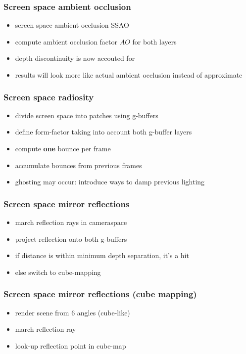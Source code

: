 \documentclass[aspectratio=169]{beamer}
\begin{document}
	\begin{frame}
		\frametitle{Screen space ambient occlusion}
		\begin{itemize}
			\item screen space ambient occlusion SSAO
			\item compute ambient occlusion factor $AO$ for both layers
			\item depth discontinuity is now accouted for
			\item results will look more like actual ambient occlusion instead of approximate
		\end{itemize}
	\end{frame}	

	\begin{frame}
		\frametitle{Screen space radiosity}
		\begin{itemize}
			\item divide screen space into patches using g-buffers
			\item define form-factor taking into account both g-buffer layers
			\item compute \textbf{one} bounce per frame
			\item accumulate bounces from previous frames
			\item ghosting may occur: introduce ways to damp previous lighting
			
		\end{itemize}
	\end{frame}	

	\begin{frame}
		\frametitle{Screen space mirror reflections}
		\begin{itemize}
			\item march reflection rays in cameraspace
			\item project reflection onto both g-buffers
			\item if distance is within minimum depth separation, it's a hit
			\item else switch to cube-mapping
		\end{itemize}
	\end{frame}	

	\begin{frame}
		\frametitle{Screen space mirror reflections (cube mapping)}
		\begin{itemize}
			\item render scene from 6 angles (cube-like)
			\item march reflection ray
			\item look-up reflection point in cube-map
		\end{itemize}
	\end{frame}	
\end{document}
